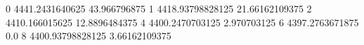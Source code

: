 0 4441.2431640625 43.966796875
1 4418.93798828125 21.66162109375
2 4410.166015625 12.8896484375
4 4400.2470703125 2.970703125
6 4397.2763671875 0.0
8 4400.93798828125 3.66162109375
